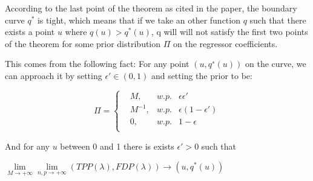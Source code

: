 \documentclass[10pt,onecolumn,letterpaper]{article}
\begin{document}
According to the last point of the theorem as cited in the paper, the boundary curve $q^*$ is tight, which means that if we take an other function $q$ such that there exists a point $u$ where $q(u) > q^*(u)$, q will will not satisfy the first two points of the theorem for some prior distribution $\Pi$ on the regressor coefficients.
\newline

This comes from the following fact: For any point $\left(u,q^∗(u) \right)$ on the curve, we can approach it by setting $\epsilon \prime \in (0,1)$ and setting the prior to be:

\begin{equation}
   \Pi = 
   \left\{
       \begin{aligned}
         &M,      &w.p.&\epsilon \epsilon \prime \\
         &M^{-1}, &w.p.&\epsilon(1-\epsilon \prime)\\
         &0,      &w.p.& 1 - \epsilon \\
       \end{aligned}
     \right.
 \end{equation}
\newline

And for any $u$ between 0 and 1 there is exists $\epsilon \prime > 0 $  such that

\begin{center}
$\lim\limits_{M \rightarrow +\infty} \lim\limits_{n,p \rightarrow +\infty}  (TPP(\lambda), FDP(\lambda)) \rightarrow  (u,q^*(u))$
\end{center}
\end{document}
